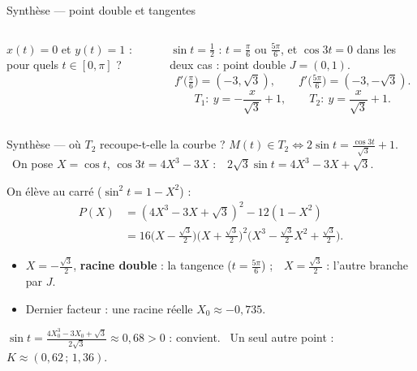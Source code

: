\documentclass[aspectratio=169,11pt]{beamer}
\newcommand{\rep}[1]{\textcolor{Vert}{#1}}%
\begin{document}
\begin{frame}{Synthèse --- point double et tangentes}
\begin{columns}[c]
\begin{ATOI}
$x(t)=0$ et $y(t)=1$ : pour quels $t\in[0,\pi]$ ?
\end{ATOI}
\pause
$\sin t=\frac12$ : $t=\frac\pi6$ ou $\frac{5\pi}6$, et $\cos3t=0$ dans les deux cas : \rep{point double $J=(0,1)$}.
\pause
\[f'\big(\tfrac\pi6\big)=(-3,\sqrt3),\qquad f'\big(\tfrac{5\pi}6\big)=(-3,-\sqrt3).\]
\pause
\[T_1:\ y=-\frac x{\sqrt3}+1,\qquad T_2:\ y=\frac x{\sqrt3}+1.\]
\centering{}
\end{columns}
\end{frame}

\begin{frame}{Synthèse --- où $T_2$ recoupe-t-elle la courbe ?}
$M(t)\in T_2\iff2\sin t=\frac{\cos3t}{\sqrt3}+1$. \ On pose $X=\cos t$, $\cos3t=4X^3-3X$ :\ \ $2\sqrt3\sin t=4X^3-3X+\sqrt3$.
\pause
\par\smallskip
On élève au carré ($\sin^2t=1-X^2$) :
\begin{align*}P(X)&=(4X^3-3X+\sqrt3)^2-12(1-X^2)\\&=16\Big(X-\tfrac{\sqrt3}2\Big)\Big(X+\tfrac{\sqrt3}2\Big)^2\Big(X^3-\tfrac{\sqrt3}2X^2+\tfrac{\sqrt3}2\Big).\end{align*}
\pause
\begin{itemize}
\item $X=-\frac{\sqrt3}2$, \textbf{racine double} : la tangence ($t=\frac{5\pi}6$) ;\ \ $X=\frac{\sqrt3}2$ : l'autre branche par $J$.
\item Dernier facteur : une racine réelle $X_0\approx-0{,}735$.
\end{itemize}
\pause
\begin{PIEGE}
$\sin t=\frac{4X_0^3-3X_0+\sqrt3}{2\sqrt3}\approx0{,}68>0$ : convient. \ Un seul autre point : $K\approx(0{,}62\,;\,1{,}36)$.
\end{PIEGE}
\end{frame}
\end{document}
